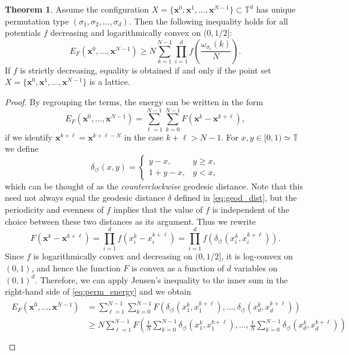 \documentclass[a4paper,12pt]{article}
\numberwithin{equation}{section}
\theoremstyle{definition}
\newtheorem{thm}{Theorem}[section]
\newcommand{\bx}{\mathbf{x}}
\begin{document}
\begin{thm}\label{thm:permtype}
    Assume the configuration  $X=\{ \bx^0, \bx^1,\dots,\bx^{N-1} \} \subset \mathbb T^d $ has unique permutation type $(\sigma_1,\sigma_2,\dots,\sigma_d)$. Then the following inequality holds for all  potentials $f$ decreasing and logarithmically convex on $(0,1/2]$:
    $$E_F(\bx^0,\dots,\bx^{N-1})\ge N\sum_{k=1}^{N-1}\prod_{i=1}^df\left(\frac{\omega_{\sigma_i}(k)}{N}\right).$$
    If $f$ is strictly decreasing, equality is obtained if and only if the point set $X = \{ \bx^0, \bx^1,\dots,\bx^{N-1} \}$ is a lattice.
\end{thm}



\begin{proof}
    By regrouping the terms,  the energy can be written in the form \begin{equation}\label{eq:perm_energy}
        E_F(\bx^0,\dots,\bx^{N-1})=\sum_{\ell=1}^{N-1}\sum_{k=0}^{N-1} F(\bx^k-\bx^{k+\ell}),
    \end{equation}
    if we identify $\bx^{k+\ell}=\bx^{k+\ell-N}$ in the case $k+\ell>N-1$. For $x,y \in [0,1) \simeq \mathbb T$ we define
    $$
    \delta_\circlearrowleft(x,y)=\begin{cases}
        y-x, & y \geq x, \\
        1+y-x, & y < x,
    \end{cases}
    $$
    which can be thought of as the \emph{counterclockwise} geodesic distance. Note that this need not always equal the geodesic distance $\delta$ defined in \eqref{eq:geod_dist}, but the periodicity and evenness of $f$ implies  that the value of  $f$ is independent of the choice between these two distances as its argument. Thus we rewrite 
    \begin{equation*}
    F\left(\bx^k-\bx^{k+\ell}\right)=\prod_{i=1}^df\left(x_i^k-x_i^{k+\ell}\right)  = \prod_{i=1}^df\left(\delta_\circlearrowleft(x_i^k,x_i^{k+\ell})\right).\end{equation*}
    Since $f$ is logarithmically convex and decreasing on $(0,1/2]$, it is log-convex on $(0,1)$, and hence  
    the function $F$ is convex as a function of $d$ variables on $(0,1)^d$. Therefore, we can apply  Jensen's inequality to the inner sum in  the right-hand side of \eqref{eq:perm_energy} and we obtain %
     \begin{align}\label{eq:jensens}
     \begin{split}
         E_F(\bx^0,\dots,\bx^{N-1}) &  =  \sum_{\ell=1}^{N-1} \sum_{k=0}^{N-1} F \left( \delta_\circlearrowleft(x_1^k,x_1^{k+\ell}), \dots, \delta_\circlearrowleft(x_d^k,x_d^{k+\ell} )\right)\\ & \ge N\sum_{\ell=1}^{N-1}F\left(\frac{1}{N}\sum_{k=0}^{N-1}\delta_\circlearrowleft(x_1^k,x_1^{k+\ell}),\dots,\frac{1}{N}\sum_{k=0}^{N-1}\delta_\circlearrowleft(x_d^k,x_d^{k+\ell})\right)\\

\end{split}
\end{align}
\end{proof}
\end{document}
